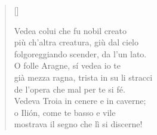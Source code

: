 \documentclass{article}
\begin{document}
\begin{verse}[\versewidth]
  \begin{patverse*}
    Vedea colui che fu nobil creato\\
    più ch'altra creatura, giù dal cielo\\
    folgoreggiando scender, da l'un lato.\\
    O folle Aragne, sí vedea io te\\
    già mezza ragna, trista in su li stracci\\
    de l'opera che mal per te si fé.\\
    Vedeva Troia in cenere e in caverne;\\
    o Ilión, come te basso e vile\\
    mostrava il segno che lì si discerne!\\
  \end{patverse*}
\end{verse}
\end{document}
